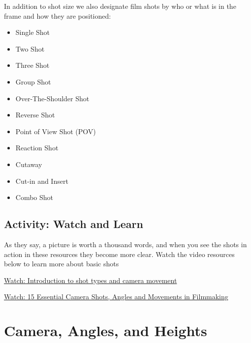 \documentclass[
]{book}
\providecommand{\tightlist}{%
  \setlength{\itemsep}{0pt}\setlength{\parskip}{0pt}}
\begin{document}
In addition to shot size we also designate film shots by who or what is in the frame and how they are positioned:

\begin{itemize}
\tightlist
\item
  Single Shot\\
\item
  Two Shot\\
\item
  Three Shot\\
\item
  Group Shot\\
\item
  Over-The-Shoulder Shot\\
\item
  Reverse Shot\\
\item
  Point of View Shot (POV)\\
\item
  Reaction Shot\\
\item
  Cutaway\\
\item
  Cut-in and Insert\\
\item
  Combo Shot
\end{itemize}

\hypertarget{activity-watch-and-learn-1}{%
\subsection*{Activity: Watch and Learn}\label{activity-watch-and-learn-1}}

\begin{reflect}
As they say, a picture is worth a thousand words, and when you see the shots in action in these resources they become more clear. Watch the video resources below to learn more about basic shots

\href{https://www.youtube.com/watch?v=lRo2IqYbEaE}{Watch: Introduction to shot types and camera movement}

\href{https://www.youtube.com/watch?v=7y0ouVBcogU}{Watch: 15 Essential Camera Shots, Angles and Movements in Filmmaking}
\end{reflect}

\hypertarget{camera-angles-and-heights}{%
\section{Camera, Angles, and Heights}\label{camera-angles-and-heights}}
\end{document}
